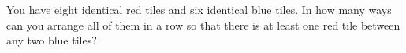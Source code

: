 You have eight identical red tiles and six identical blue tiles. In how many ways can you arrange all of them in a row so that there is at least one red tile between any two blue tiles?
